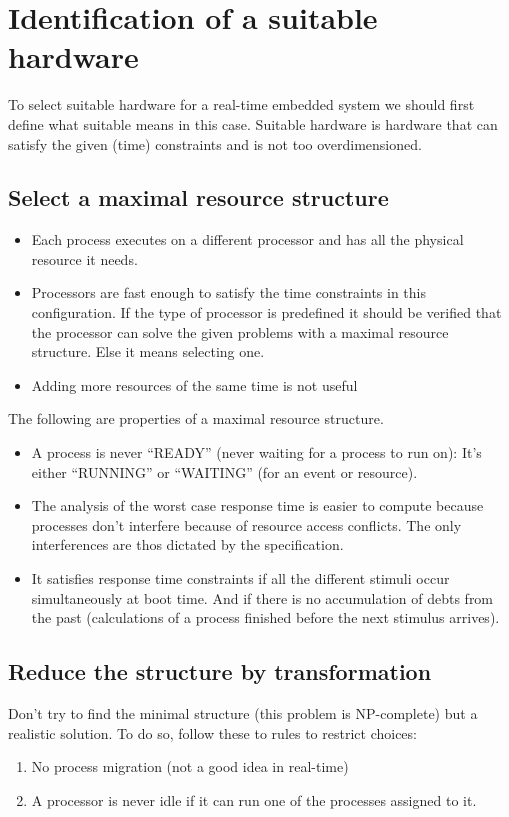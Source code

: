 \documentclass[../main.tex]{subfiles}
\begin{document}
\chapter{Identification of a suitable hardware}
To select suitable hardware  for a real-time embedded system we should first define what suitable means in this case. Suitable hardware is hardware that can satisfy the given (time) constraints and is not too overdimensioned.

\section{Select a maximal resource structure}

\begin{itemize}
	\item Each process executes on a different processor  and has all the physical resource it needs.
	\item Processors are fast enough to satisfy the time constraints in this configuration. If the type of processor is predefined it should be verified that the processor can solve the given problems with a maximal resource structure. Else it means selecting one.
	\item Adding more resources of the same time is not useful
\end{itemize}

The following are properties of a maximal resource  structure.
\begin{itemize}
	\item A process is never ``READY'' (never waiting for a process to run on): It's either ``RUNNING'' or ``WAITING'' (for an event or resource).
	\item The analysis of the worst case response time is easier to compute because processes don't interfere because of resource access conflicts. The only interferences are thos dictated by the specification.
	\item It satisfies response time constraints if all the different stimuli occur simultaneously at boot time. And if there is no accumulation of debts from the past (calculations of a process finished before the next stimulus arrives).
\end{itemize}

\section{Reduce the structure by transformation}
Don't try to find the minimal structure (this problem is NP-complete) but a realistic solution. To do so, follow these to rules to restrict choices:
\begin{enumerate}
	\item No process migration  (not a good idea in real-time)
	\item A processor is never idle if it can run one of the processes assigned to it.
\end{enumerate}
\end{document}
